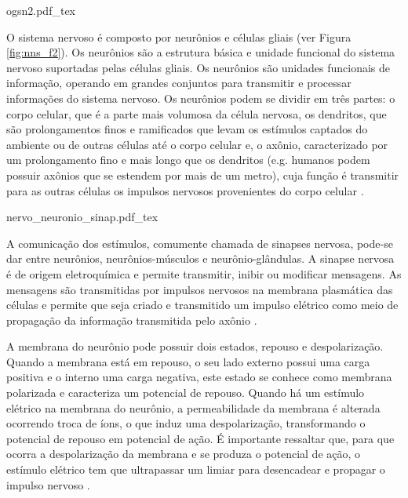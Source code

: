 \begin{figure*}
    \centering %
    \small %
    \def\svgwidth{0.9\columnwidth}%
    {ogsn2.pdf_tex}
    \caption{Organização geral do sistema nervoso.}
    \label{fig:ogsn_f1}
\end{figure*}

O sistema nervoso é composto por neurônios e células gliais (ver Figura \ref{fig:nns_f2}). Os neurônios são a estrutura básica e unidade funcional do sistema nervoso suportadas pelas células gliais. Os neurônios são unidades funcionais de informação, operando em grandes conjuntos para transmitir e processar informações do sistema nervoso. Os neurônios podem se dividir em três partes: o corpo celular, que é a parte mais volumosa da célula nervosa, os dendritos, que são prolongamentos finos e ramificados que levam os estímulos captados do ambiente ou de outras células até o corpo celular e, o axônio, caracterizado por um prolongamento fino e mais longo que os dendritos (e.g. humanos podem possuir axônios que se estendem por mais de um metro), cuja função é transmitir para as outras células os impulsos nervosos provenientes do corpo celular \cite{Lent2002}.


\begin{figure*}
    \centering %
    \small %
    \def\svgwidth{1\columnwidth}%
    {nervo_neuronio_sinap.pdf_tex}
    \caption{Ilustração de um nervo, neurônio e sinapses (adaptado de \cite{Fonseca2015}).}
    \label{fig:nns_f2}
\end{figure*}

A comunicação dos estímulos, comumente chamada de sinapses nervosa, pode-se dar entre neurônios, neurônios-músculos e neurônio-glândulas. A sinapse nervosa é de origem eletroquímica e permite transmitir, inibir ou modificar mensagens. As mensagens são transmitidas por impulsos nervosos na membrana plasmática das células e permite que seja criado e transmitido um impulso elétrico como meio de propagação da informação transmitida pelo axônio \cite{Lent2002}.

A membrana do neurônio pode possuir dois estados, repouso e despolarização. Quando a membrana está em repouso, o seu lado externo possui uma carga positiva e o interno uma carga negativa, este estado se conhece como membrana polarizada e caracteriza um potencial de repouso. Quando há um estímulo elétrico na membrana do neurônio, a permeabilidade da membrana é alterada ocorrendo troca de íons, o que induz uma despolarização, transformando o potencial de repouso em potencial de ação. É importante ressaltar que, para que ocorra a despolarização da membrana e se produza o potencial de ação, o estímulo elétrico tem que ultrapassar um limiar para desencadear e propagar o impulso nervoso \cite{Lent2002}.  

